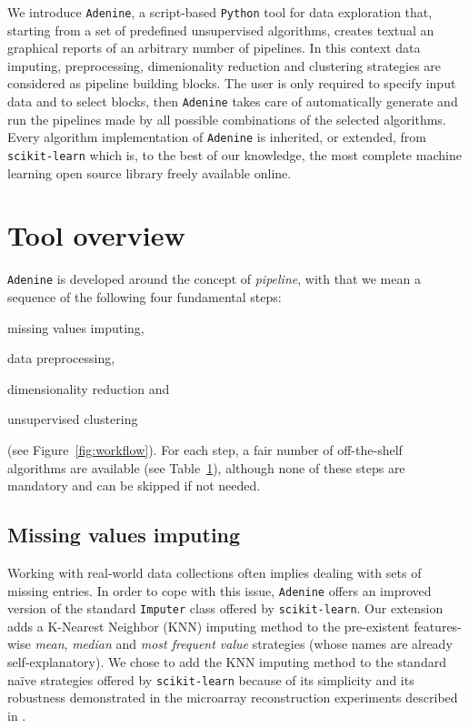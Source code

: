 \documentclass[twoside,11pt]{article}
\makeatletter
\newcommand{\ade}{\texttt{Adenine}\@\xspace}
\newcommand{\py}{\texttt{Python}\@\xspace}
\makeatother
\begin{document}
We introduce \ade, a script-based \py tool for data exploration that, starting from a set of predefined unsupervised algorithms, creates textual an graphical reports of an arbitrary number of pipelines. In this context data imputing, preprocessing, dimenionality reduction and clustering strategies are considered as pipeline building blocks. The user is only required to specify input data and to select blocks, then \ade takes care of automatically generate and run the pipelines made by all possible combinations of the selected algorithms. Every algorithm implementation of \ade is inherited, or extended, from \texttt{scikit-learn} \citep{scikit-learn} which is, to the best of our knowledge, the most complete machine learning open source library freely available online.


\section{Tool overview}\label{sec:implem}
\ade is developed around the concept of \emph{pipeline}, with that we mean a sequence of the following four fundamental steps:
\begin{enumerate*}[label=(\roman*)]
  \item missing values imputing,
  \item data preprocessing,
  \item dimensionality reduction and
  \item unsupervised clustering
\end{enumerate*} (see Figure~\ref{fig:workflow}).
For each step, a fair number of off-the-shelf algorithms are available (see Table~\ref{sec:implem}), although none of these steps are mandatory and can be skipped if not needed.

\subsection*{Missing values imputing}
Working with real-world data collections often implies dealing with sets of missing entries. In order to cope with this issue, \ade offers an improved version of the standard \texttt{Imputer} class offered by \texttt{scikit-learn}. Our extension adds a K-Nearest Neighbor (KNN) imputing method to the pre-existent features-wise \emph{mean}, \emph{median} and \emph{most frequent value} strategies (whose names are already self-explanatory). We chose to add the KNN imputing method to the standard na\"ive strategies offered by \texttt{scikit-learn} because of its simplicity and its robustness demonstrated in the microarray reconstruction experiments described in \citep{troyanskaya2001missing}.
\end{document}

